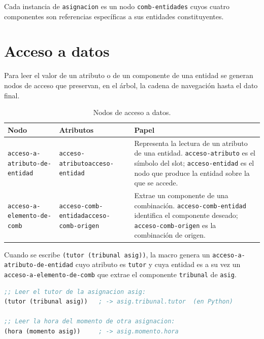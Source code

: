 \documentclass[12pt,a4paper]{report}
\begin{document}
Cada instancia de \texttt{asignacion} es un nodo \texttt{comb-entidades}
cuyos cuatro componentes son referencias específicas a sus entidades
constituyentes.

\section{Acceso a datos}
\label{sec:acceso}

Para leer el valor de un atributo o de un componente de una entidad se
generan nodos de acceso que preservan, en el árbol, la cadena de
navegación hasta el dato final.

\begin{table}[h!]
\centering
\caption{Nodos de acceso a datos.}
\label{tab:acceso}
\renewcommand{\arraystretch}{1.3}
\begin{tabular}{p{4.8cm} p{4.5cm} p{5.5cm}}
\hline
\textbf{Nodo} & \textbf{Atributos} & \textbf{Papel} \\
\hline
\texttt{acceso-a-atributo-de-entidad}
  & \texttt{acceso-atributo}\newline\texttt{acceso-entidad}
  & Representa la lectura de un atributo de una entidad.
    \texttt{acceso-atributo} es el símbolo del slot;
    \texttt{acceso-entidad} es el nodo que produce la entidad
    sobre la que se accede. \\
\hline
\texttt{acceso-a-elemento-de-comb}
  & \texttt{acceso-comb-entidad}\newline\texttt{acceso-comb-origen}
  & Extrae un componente de una combinación.
    \texttt{acceso-comb-entidad} identifica el componente deseado;
    \texttt{acceso-comb-origen} es la combinación de origen. \\
\hline
\end{tabular}
\end{table}

\medskip
\noindent
Cuando se escribe \texttt{(tutor (tribunal asig))}, la macro genera un
\texttt{acceso-a-atributo-de-entidad} cuyo atributo es \texttt{tutor} y
cuya entidad es a su vez un \texttt{acceso-a-elemento-de-comb} que extrae
el componente \texttt{tribunal} de \texttt{asig}.  

\begin{lstlisting}[language=CommonLisp, caption={Acceso encadenado a atributos de una combinacion.}]
;; Leer el tutor de la asignacion asig:
(tutor (tribunal asig))   ; -> asig.tribunal.tutor  (en Python)

;; Leer la hora del momento de otra asignacion:
(hora (momento asig))     ; -> asig.momento.hora
\end{lstlisting}
\end{document}

